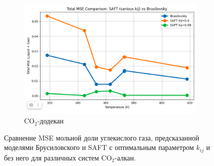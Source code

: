 \documentclass[a4paper,12pt]{article}
\begin{document}
\begin{itemize}
\begin{itemize}
\begin{figure}[ht]
\begin{subfigure}{0.30\textwidth}
        \includegraphics[width=\textwidth]{images/mole_dodecane.png}
        \caption{$\mathrm{CO}_2$-додекан}
        \label{fig:rmse_dodecane}
    \end{subfigure}

    \caption{Сравнение MSE мольной доли углекислого газа, предсказанной моделями Брусиловского и SAFT с оптимальным параметром \( k_{ij} \) и без него для различных систем $\mathrm{CO}_2$-алкан.}
    \label{fig:rmse_comparison}
\end{figure}
	

\end{itemize}
\end{itemize}
\end{document}
